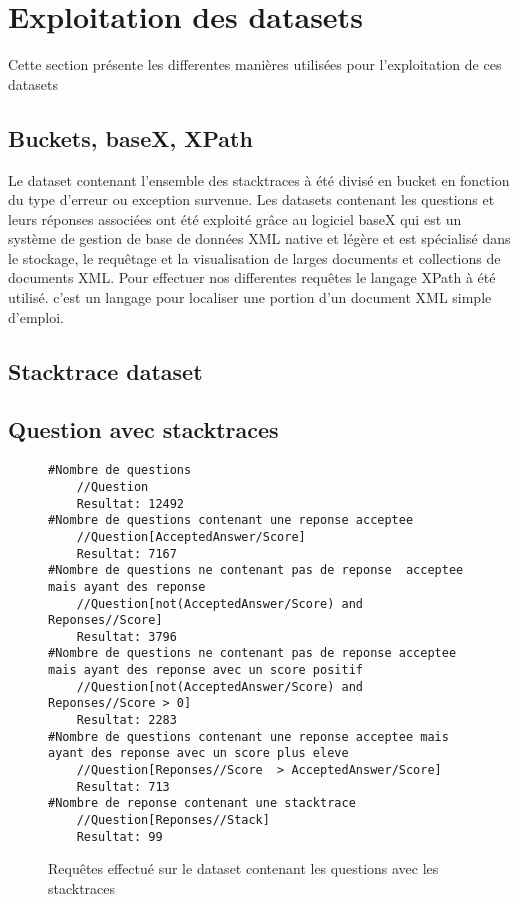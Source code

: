 \section{Exploitation des datasets}
Cette section présente les differentes manières utilisées pour l'exploitation de ces datasets
\subsection{Buckets, baseX, XPath}
Le dataset contenant l'ensemble des stacktraces à été divisé en bucket en fonction du type d'erreur ou exception survenue.
Les datasets contenant les questions et leurs réponses associées ont été exploité grâce au logiciel baseX qui  est un système de gestion de base de données XML native et légère et est spécialisé dans le stockage, le requêtage et la visualisation de larges documents et collections de documents XML.
Pour effectuer nos differentes requêtes le langage XPath à été utilisé. c'est un langage pour localiser une portion d'un document XML simple d'emploi.

\subsection{Stacktrace dataset}
\subsection{Question avec stacktraces}
\begin{figure}
\begin{lstlisting}
#Nombre de questions
    //Question
    Resultat: 12492
#Nombre de questions contenant une reponse acceptee
    //Question[AcceptedAnswer/Score]
    Resultat: 7167
#Nombre de questions ne contenant pas de reponse  acceptee mais ayant des reponse
    //Question[not(AcceptedAnswer/Score) and Reponses//Score]
    Resultat: 3796
#Nombre de questions ne contenant pas de reponse acceptee mais ayant des reponse avec un score positif
    //Question[not(AcceptedAnswer/Score) and Reponses//Score > 0] 
    Resultat: 2283
#Nombre de questions contenant une reponse acceptee mais ayant des reponse avec un score plus eleve
    //Question[Reponses//Score  > AcceptedAnswer/Score]
    Resultat: 713
#Nombre de reponse contenant une stacktrace
    //Question[Reponses//Stack]
    Resultat: 99
\end{lstlisting}
\caption{Requêtes effectué sur le dataset contenant les questions avec les stacktraces}
\label{code:resultatAvecStack}
\end{figure}

